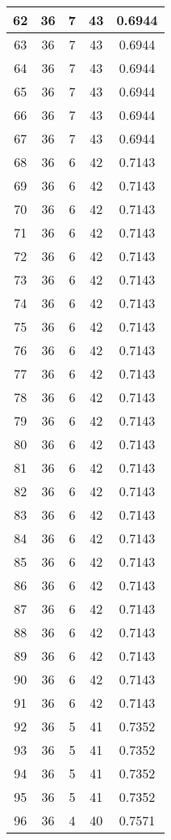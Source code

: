 \documentclass[letterpaper, 12pt]{article}
\begin{document}
\begin{longtable}{|c|c|c|c|c|}
\hline
62 & 36 & 7 & 43 & 0.6944 \\
\hline
63 & 36 & 7 & 43 & 0.6944 \\
\hline
64 & 36 & 7 & 43 & 0.6944 \\
\hline
65 & 36 & 7 & 43 & 0.6944 \\
\hline
66 & 36 & 7 & 43 & 0.6944 \\
\hline
67 & 36 & 7 & 43 & 0.6944 \\
\hline
68 & 36 & 6 & 42 & 0.7143 \\
\hline
69 & 36 & 6 & 42 & 0.7143 \\
\hline
70 & 36 & 6 & 42 & 0.7143 \\
\hline
71 & 36 & 6 & 42 & 0.7143 \\
\hline
72 & 36 & 6 & 42 & 0.7143 \\
\hline
73 & 36 & 6 & 42 & 0.7143 \\
\hline
74 & 36 & 6 & 42 & 0.7143 \\
\hline
75 & 36 & 6 & 42 & 0.7143 \\
\hline
76 & 36 & 6 & 42 & 0.7143 \\
\hline
77 & 36 & 6 & 42 & 0.7143 \\
\hline
78 & 36 & 6 & 42 & 0.7143 \\
\hline
79 & 36 & 6 & 42 & 0.7143 \\
\hline
80 & 36 & 6 & 42 & 0.7143 \\
\hline
81 & 36 & 6 & 42 & 0.7143 \\
\hline
82 & 36 & 6 & 42 & 0.7143 \\
\hline
83 & 36 & 6 & 42 & 0.7143 \\
\hline
84 & 36 & 6 & 42 & 0.7143 \\
\hline
85 & 36 & 6 & 42 & 0.7143 \\
\hline
86 & 36 & 6 & 42 & 0.7143 \\
\hline
87 & 36 & 6 & 42 & 0.7143 \\
\hline
88 & 36 & 6 & 42 & 0.7143 \\
\hline
89 & 36 & 6 & 42 & 0.7143 \\
\hline
90 & 36 & 6 & 42 & 0.7143 \\
\hline
91 & 36 & 6 & 42 & 0.7143 \\
\hline
92 & 36 & 5 & 41 & 0.7352 \\
\hline
93 & 36 & 5 & 41 & 0.7352 \\
\hline
94 & 36 & 5 & 41 & 0.7352 \\
\hline
95 & 36 & 5 & 41 & 0.7352 \\
\hline
96 & 36 & 4 & 40 & 0.7571 \\

\end{longtable}
\end{document}
